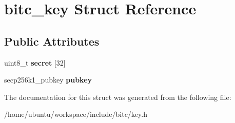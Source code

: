 \hypertarget{structbitc__key}{\section{bitc\-\_\-key Struct Reference}
\label{structbitc__key}
}
\subsection*{Public Attributes}
\begin{DoxyCompactItemize}
\item 
\hypertarget{structbitc__key_a8c8f16b87a991dd6cafbaa3858b36a1b}{uint8\-\_\-t {\bfseries secret} \mbox{[}32\mbox{]}}\label{structbitc__key_a8c8f16b87a991dd6cafbaa3858b36a1b}

\item 
\hypertarget{structbitc__key_a305e3e31e16b16127eb6835b5aa9b225}{secp256k1\-\_\-pubkey {\bfseries pubkey}}\label{structbitc__key_a305e3e31e16b16127eb6835b5aa9b225}

\end{DoxyCompactItemize}


The documentation for this struct was generated from the following file\-:\begin{DoxyCompactItemize}
\item 
/home/ubuntu/workspace/include/bitc/key.\-h\end{DoxyCompactItemize}

